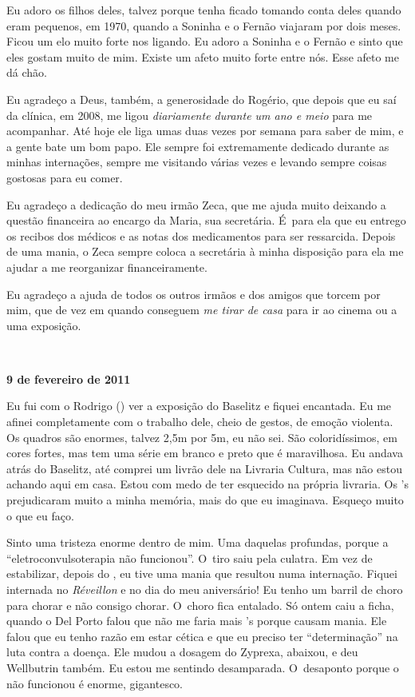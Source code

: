 Eu adoro os filhos deles, talvez porque tenha ficado tomando conta deles
quando eram pequenos, em 1970, quando a Soninha e o Fernão viajaram por
dois meses. Ficou um elo muito forte nos ligando. Eu adoro a Soninha e o
Fernão e sinto que eles gostam muito de mim. Existe um afeto muito forte
entre nós. Esse afeto me dá chão.

Eu agradeço a Deus, também, a generosidade do Rogério, que depois que eu
saí da clínica, em 2008, me ligou \emph{diariamente durante um ano e
meio} para me acompanhar. Até hoje ele liga umas duas vezes por semana
para saber de mim, e a gente bate um bom papo. Ele sempre foi
extremamente dedicado durante as minhas internações, sempre me visitando
várias vezes e levando sempre coisas gostosas para eu comer.

Eu agradeço a dedicação do meu irmão Zeca, que me ajuda muito deixando a
questão financeira ao encargo da Maria, sua secretária. É~para ela que
eu entrego os recibos dos médicos e as notas dos medicamentos para ser
ressarcida. Depois de uma mania, o Zeca sempre coloca a secretária à
minha disposição para ela me ajudar a me reorganizar financeiramente.

Eu agradeço a ajuda de todos os outros irmãos e dos amigos que torcem
por mim, que de vez em quando conseguem \emph{me tirar de casa} para ir
ao cinema ou a uma exposição.

\begin{center}\asterisc{}​\end{center}


\begin{flushright}\textbf{9 de fevereiro de 2011}\end{flushright}


Eu fui com o Rodrigo () ver a exposição do Baselitz e fiquei
encantada. Eu me afinei completamente com o trabalho dele, cheio de
gestos, de emoção violenta. Os quadros são enormes, talvez 2,5m por 5m,
eu não sei. São coloridíssimos, em cores fortes, mas tem uma série em
branco e preto que é maravilhosa. Eu andava atrás do Baselitz, até
comprei um livrão dele na Livraria Cultura, mas não estou achando aqui
em casa. Estou com medo de ter esquecido na própria livraria. Os 's
prejudicaram muito a minha memória, mais do que eu imaginava. Esqueço
muito o que eu faço.

Sinto uma tristeza enorme dentro de mim. Uma daquelas profundas, porque
a ``eletroconvulsoterapia não funcionou''. O~tiro saiu pela culatra. Em
vez de estabilizar, depois do , eu tive uma mania que resultou numa
internação. Fiquei internada no \emph{Réveillon} e no dia do meu
aniversário! Eu tenho um barril de choro para chorar e não consigo
chorar. O~choro fica entalado. Só ontem caiu a ficha, quando o Del Porto
falou que não me faria mais 's porque causam mania. Ele falou que eu
tenho razão em estar cética e que eu preciso ter ``determinação'' na
luta contra a doença. Ele mudou a dosagem do Zyprexa, abaixou, e deu
Wellbutrin  também. Eu estou me sentindo desamparada. O~desaponto
porque o  não funcionou é enorme, gigantesco.

